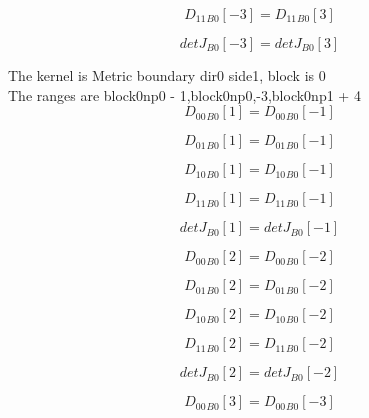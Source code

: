 \documentclass{article}
\begin{document}
\begin{dmath}{D_{11}{_{B0}}}[{-3}] = {D_{11}{_{B0}}}[{3}]\end{dmath}

\begin{dmath}{detJ{_{B0}}}[{-3}] = {detJ{_{B0}}}[{3}]\end{dmath}

\noindent The kernel is Metric boundary dir0 side1, block is 0\\\noindent The ranges are block0np0 - 1,block0np0,-3,block0np1 + 4\\\begin{dmath}{D_{00}{_{B0}}}[{1}] = {D_{00}{_{B0}}}[{-1}]\end{dmath}

\begin{dmath}{D_{01}{_{B0}}}[{1}] = {D_{01}{_{B0}}}[{-1}]\end{dmath}

\begin{dmath}{D_{10}{_{B0}}}[{1}] = {D_{10}{_{B0}}}[{-1}]\end{dmath}

\begin{dmath}{D_{11}{_{B0}}}[{1}] = {D_{11}{_{B0}}}[{-1}]\end{dmath}

\begin{dmath}{detJ{_{B0}}}[{1}] = {detJ{_{B0}}}[{-1}]\end{dmath}

\begin{dmath}{D_{00}{_{B0}}}[{2}] = {D_{00}{_{B0}}}[{-2}]\end{dmath}

\begin{dmath}{D_{01}{_{B0}}}[{2}] = {D_{01}{_{B0}}}[{-2}]\end{dmath}

\begin{dmath}{D_{10}{_{B0}}}[{2}] = {D_{10}{_{B0}}}[{-2}]\end{dmath}

\begin{dmath}{D_{11}{_{B0}}}[{2}] = {D_{11}{_{B0}}}[{-2}]\end{dmath}

\begin{dmath}{detJ{_{B0}}}[{2}] = {detJ{_{B0}}}[{-2}]\end{dmath}

\begin{dmath}{D_{00}{_{B0}}}[{3}] = {D_{00}{_{B0}}}[{-3}]\end{dmath}
\end{document}

